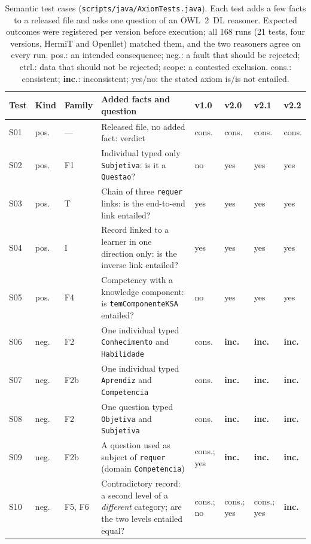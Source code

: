 \begin{table}[!t]
\caption{Semantic test cases (\texttt{scripts/java/AxiomTests.java}). Each test adds a few facts to a released file and asks one question of an OWL~2~DL reasoner. Expected outcomes were registered per version before execution; all 168 runs (21 tests, four versions, HermiT and Openllet) matched them, and the two reasoners agree on every run. pos.: an intended consequence; neg.: a fault that should be rejected; ctrl.: data that should not be rejected; scope: a contested exclusion. cons.: consistent; \textbf{inc.}: inconsistent; yes/no: the stated axiom is/is not entailed.}
\label{tab:tests}
\centering
\footnotesize
\setlength{\tabcolsep}{4pt}
\begin{tabular}{ll>{\raggedright\arraybackslash}p{0.9cm}>{\raggedright\arraybackslash}p{7.3cm}llll}
\hline
\textbf{Test} & \textbf{Kind} & \textbf{Family} & \textbf{Added facts and question} & \textbf{v1.0} & \textbf{v2.0} & \textbf{v2.1} & \textbf{v2.2} \\
\hline
S01 & pos. & --- & Released file, no added fact: verdict & cons. & cons. & cons. & cons. \\
S02 & pos. & F1 & Individual typed only \texttt{Subjetiva}: is it a \texttt{Questao}? & no & yes & yes & yes \\
S03 & pos. & T & Chain of three \texttt{requer} links: is the end-to-end link entailed? & yes & yes & yes & yes \\
S04 & pos. & I & Record linked to a learner in one direction only: is the inverse link entailed? & yes & yes & yes & yes \\
S05 & pos. & F4 & Competency with a knowledge component: is \texttt{temComponenteKSA} entailed? & no & yes & yes & yes \\
S06 & neg. & F2 & One individual typed \texttt{Conhecimento} and \texttt{Habilidade} & cons. & \textbf{inc.} & \textbf{inc.} & \textbf{inc.} \\
S07 & neg. & F2b & One individual typed \texttt{Aprendiz} and \texttt{Competencia} & cons. & \textbf{inc.} & \textbf{inc.} & \textbf{inc.} \\
S08 & neg. & F2 & One question typed \texttt{Objetiva} and \texttt{Subjetiva} & cons. & \textbf{inc.} & \textbf{inc.} & \textbf{inc.} \\
S09 & neg. & F2b & A question used as subject of \texttt{requer} (domain \texttt{Competencia}) & cons.; yes & \textbf{inc.} & \textbf{inc.} & \textbf{inc.} \\
S10 & neg. & F5, F6 & Contradictory record: a second level of a \emph{different} category; are the two levels entailed equal? & cons.; no & cons.; yes & cons.; yes & \textbf{inc.} \\

\end{tabular}
\end{table}
